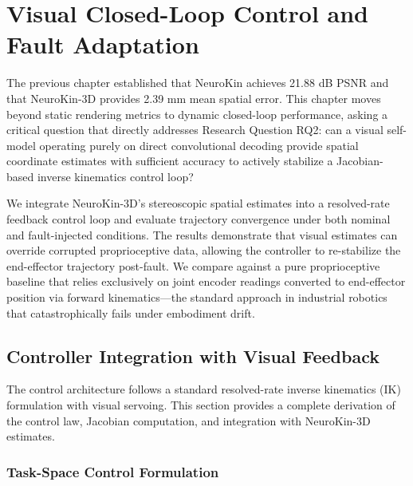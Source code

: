 \documentclass[12pt,a4paper,oneside]{report}
\begin{document}
\clearpage

\chapter{Visual Closed-Loop Control and Fault Adaptation}
\label{chap:closed_loop_fault_adaptation}

The previous chapter established that NeuroKin achieves 21.88 dB PSNR and that NeuroKin-3D provides 2.39 mm mean spatial error. This chapter moves beyond static rendering metrics to dynamic closed-loop performance, asking a critical question that directly addresses Research Question RQ2: can a visual self-model operating purely on direct convolutional decoding provide spatial coordinate estimates with sufficient accuracy to actively stabilize a Jacobian-based inverse kinematics control loop?

We integrate NeuroKin-3D's stereoscopic spatial estimates into a resolved-rate feedback control loop and evaluate trajectory convergence under both nominal and fault-injected conditions. The results demonstrate that visual estimates can override corrupted proprioceptive data, allowing the controller to re-stabilize the end-effector trajectory post-fault. We compare against a pure proprioceptive baseline that relies exclusively on joint encoder readings converted to end-effector position via forward kinematics---the standard approach in industrial robotics that catastrophically fails under embodiment drift.

\section{Controller Integration with Visual Feedback}

The control architecture follows a standard resolved-rate inverse kinematics (IK) formulation with visual servoing. This section provides a complete derivation of the control law, Jacobian computation, and integration with NeuroKin-3D estimates.

\subsection{Task-Space Control Formulation}
\end{document}
